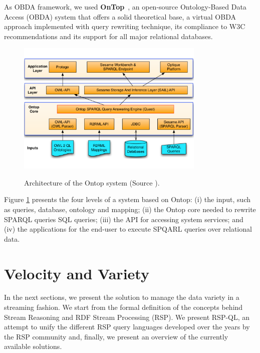 As OBDA framework, we used \textbf{OnTop}~\cite{DBLP:journals/semweb/CalvaneseCKKLRR17}, an open-source Ontology-Based Data Access (OBDA) system that offers a solid theoretical base, a virtual OBDA approach implemented with query rewriting technique, its compliance to W3C recommendations and its support for all major relational databases.

\begin{figure}[t]
  \begin{center}
    \includegraphics[width=0.8\textwidth]{img/ontop}\\
    \caption{Architecture of the Ontop system (Source \cite{DBLP:journals/semweb/CalvaneseCKKLRR17}).}
    \label{fig:ontop}
  \end{center}
\end{figure}

Figure \ref{fig:ontop} presents the four levels of a system based on Ontop: (i) the input, such as queries, database, ontology and mapping; (ii) the Ontop core needed to rewrite SPARQL queries SQL queries; (iii) the API for accessing system services; and (iv) the applications for the end-user to execute SPQARL queries over relational data.

\section{Velocity and Variety}\label{sec:vel-var}
In the next sections, we present the solution to manage the data variety in a streaming fashion. We start from the formal definition of the concepts behind Stream Reasoning and RDF Stream Processing (RSP). We present RSP-QL, an attempt to unify the different RSP query languages developed over the years by the RSP community and, finally, we present an overview of the currently available solutions.

